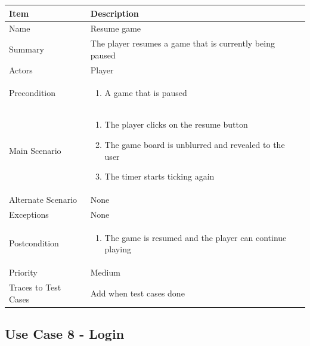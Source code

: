 \documentclass[12pt]{article}
\begin{document}
\begin{center}
\setlength{\tabcolsep}{18pt}
\renewcommand{\arraystretch}{1.3}
\begin{tabular}{ |p{3.4cm}|p{10cm}| }
    \hline
    \textbf{Item} & \textbf{Description} \\
    \hline
    Name & Resume game \\
    \hline
    Summary & The player resumes a game that is currently being paused \\
    \hline
    Actors & Player \\
    \hline
    Precondition & 
    \vspace*{-0.1in}
    \begin{enumerate}[leftmargin=0.2in]
        \item A game that is paused
    \end{enumerate}  \\
    \hline
    Main Scenario &     
    \vspace*{-0.1in}
    \begin{enumerate}[leftmargin=0.2in]
        \item The player clicks on the resume button
        \item The game board is unblurred and revealed to the user
        \item The timer starts ticking again
    \end{enumerate}  \\
    \hline
    Alternate Scenario & None \\
    \hline
    Exceptions & None \\
    \hline
    Postcondition & \vspace*{-0.1in}
    \begin{enumerate}[leftmargin=0.2in]
        \item The game is resumed and the player can continue playing
    \end{enumerate}  \\
    \hline
    Priority & Medium  \\
    \hline
    \small{Traces to Test Cases} & Add when test cases done  \\
    \hline
\end{tabular}
\end{center}

\newpage


\subsection{Use Case 8 - Login}
\end{document}

